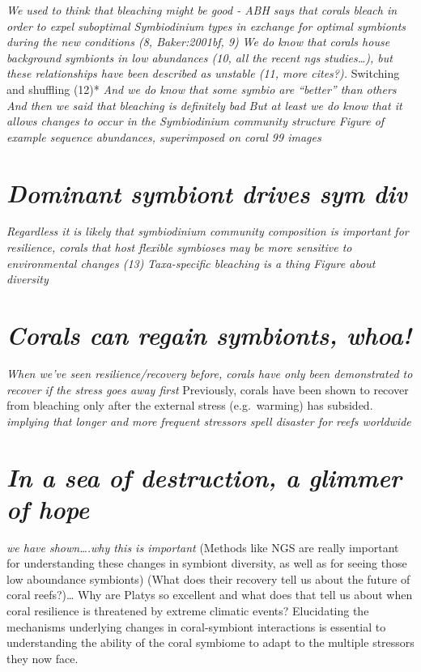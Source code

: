 \documentclass[]{article}
\begin{document}
\emph{We used to think that bleaching might be good - ABH says that
corals bleach in order to expel suboptimal Symbiodinium types in
exchange for optimal symbionts during the new conditions (8,
Baker:2001bf, 9)} \emph{We do know that corals house background
symbionts in low abundances (10, all the recent ngs studies\ldots{}),
but these relationships have been described as unstable (11, more
cites?). }Switching and shuffling (12)* \emph{And we do know that some
symbio are ``better'' than others} \emph{And then we said that bleaching
is definitely bad} \emph{But at least we do know that it allows changes
to occur in the Symbiodinium community structure} \emph{Figure of
example sequence abundances, superimposed on coral 99 images}

\section{\texorpdfstring{\emph{Dominant symbiont drives sym
div}}{Dominant symbiont drives sym div}}\label{dominant-symbiont-drives-sym-div}

\emph{Regardless it is likely that symbiodinium community composition is
important for resilience, corals that host flexible symbioses may be
more sensitive to environmental changes (13)} \emph{Taxa-specific
bleaching is a thing} \emph{Figure about diversity}

\section{\texorpdfstring{\emph{Corals can regain symbionts,
whoa!}}{Corals can regain symbionts, whoa!}}\label{corals-can-regain-symbionts-whoa}

\emph{When we've seen resilience/recovery before, corals have only been
demonstrated to recover if the stress goes away first} Previously,
corals have been shown to recover from bleaching only after the external
stress (e.g.~warming) has subsided. \emph{implying that longer and more
frequent stressors spell disaster for reefs worldwide}

\section{\texorpdfstring{\emph{In a sea of destruction, a glimmer of
hope}}{In a sea of destruction, a glimmer of hope}}\label{in-a-sea-of-destruction-a-glimmer-of-hope}

\emph{we have shown\ldots{}.why this is important} (Methods like NGS are
really important for understanding these changes in symbiont diversity,
as well as for seeing those low aboundance symbionts) (What does their
recovery tell us about the future of coral reefs?)\ldots{} Why are
Platys so excellent and what does that tell us about when coral
resilience is threatened by extreme climatic events? Elucidating the
mechanisms underlying changes in coral-symbiont interactions is
essential to understanding the ability of the coral symbiome to adapt to
the multiple stressors they now face.
\end{document}
